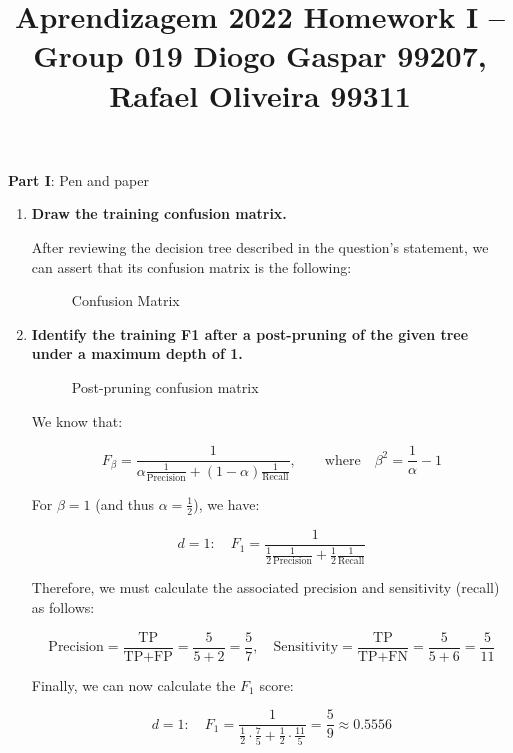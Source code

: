\documentclass[12pt]{article}
\title{\large{Aprendizagem 2022}\vskip 0.2cm Homework I -- Group 019\vskip 0.2cm Diogo Gaspar 99207, Rafael Oliveira 99311}
\date{}
\begin{document}
\maketitle
\center\large{\vskip -2.5cm\textbf{Part I}: Pen and paper}
\begin{enumerate}[leftmargin=\labelsep]
  \item \textbf{Draw the training confusion matrix.}

        After reviewing the decision tree described in the question's statement,
        we can assert that its confusion matrix is the following:

        \begin{figure}[H]
          \centering
          
          \caption{Confusion Matrix}
        \end{figure}

  \item \textbf{Identify the training F1 after a post-pruning of the given tree under a maximum depth of 1.}

        \begin{figure}[H]
          \centering
          
          \caption{Post-pruning confusion matrix}
        \end{figure}

        We know that:

        $$
          F_\beta = \frac{1}{\alpha\frac{1}{\text{Precision}} + (1 - \alpha)\frac{1}{\text{Recall}}},\qquad\text{where}\quad\beta^2 = \frac{1}{\alpha} - 1
        $$

        For $\beta = 1$ (and thus $\alpha = \frac{1}{2}$), we have:

        $$
          d = 1: \quad F_1 = \frac{1}{\frac{1}{2}\frac{1}{\text{Precision}} + \frac{1}{2}\frac{1}{\text{Recall}}}
        $$

        Therefore, we must calculate the associated precision and sensitivity (recall) as follows:

        $$
          \text{Precision} = \frac{\text{TP}}{\text{TP} + \text{FP}} = \frac{5}{5 + 2} = \frac{5}{7}, \quad \text{Sensitivity} = \frac{\text{TP}}{\text{TP} + \text{FN}} = \frac{5}{5 + 6} = \frac{5}{11}
        $$

        Finally, we can now calculate the $F_1$ score:

        $$
          d = 1: \quad F_1 = \frac{1}{\frac{1}{2}\cdot\frac{7}{5} + \frac{1}{2}\cdot\frac{11}{5}} = \frac{5}{9} \approx 0.5556
        $$


\end{enumerate}
\end{document}
